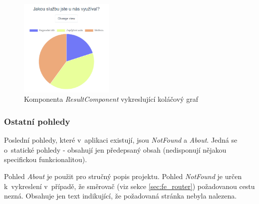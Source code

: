 		\begin{figure}[H]
			\centering
			\includegraphics[width=0.4\textwidth]{img/pohledy/formresults_graf.png}
			\caption{Komponenta \textit{ResultComponent} vykreslující koláčový graf}
			\label{fig:pohled_formresults_graf}
		\end{figure}
		
		\subsubsection{Ostatní pohledy} %
		Poslední pohledy, které v~aplikaci existují, jsou \textit{NotFound} a \textit{About}. Jedná se o~statické pohledy - obsahují jen předepsaný obsah (nedisponují nějakou specifickou funkcionalitou). 
		
		Pohled \textit{About} je použit pro stručný popis projektu. Pohled \textit{NotFound} je určen k~vykreslení v~případě, že směrovač (viz sekce \ref{sec:fe_router}) požadovanou cestu nezná. Obsahuje jen text indikující, že požadovaná stránka nebyla nalezena.
